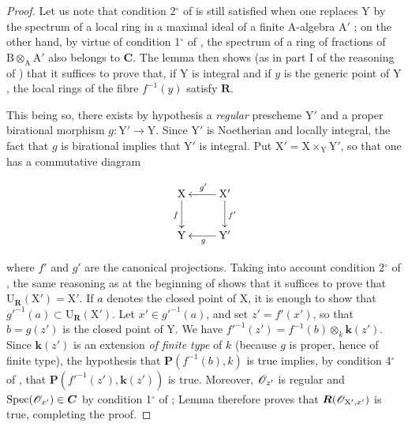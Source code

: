 \begin{proof}
Let us note that condition 2${}^\circ$ of  is still satisfied when one replaces $\mathrm{Y}$ by the spectrum of a local ring in a maximal ideal of a finite $\mathrm{A}$-algebra $\mathrm{A}'$ ; on the other hand, by virtue of condition 1${}^\circ$ of , the spectrum of a ring of fractions of $\mathrm{B}\otimes_\mathrm{A}\mathrm{A}'$ also belongs to $\boldsymbol{C}$. The lemma  then shows (as in part I of the reasoning of ) that it suffices to prove that, if $\mathrm{Y}$ is integral and if $y$ is the generic point of $\mathrm{Y}$, the local rings of the fibre $f^{-1}(y)$ satisfy $\boldsymbol{R}$.

This being so, there exists by hypothesis a \emph{regular} prescheme $\mathrm{Y}'$ and a proper birational morphism $g:\mathrm{Y}'\to\mathrm{Y}$. Since $\mathrm{Y}'$ is Noetherian and locally integral, the fact that $g$ is birational implies that $\mathrm{Y}'$ is integral. Put $\mathrm{X}'=\mathrm{X}\times_\mathrm{Y}\mathrm{Y}'$, so that one has a commutative diagram

\begin{env}[7.9.8.1]
\label{IV.7.9.8.1}
\[
  \xymatrix{
    \mathrm{X} \ar[d]_f & \mathrm{X}' \ar[l]_{g'} \ar[d]^{f'} \\
    \mathrm{Y} & \mathrm{Y}' \ar[l]^g
  }
\]
\end{env}

where $f'$ and $g'$ are the canonical projections. Taking into account condition 2${}^\circ$ of , the same reasoning as at the beginning of  shows that it suffices to prove
that $\mathrm{U}_{\mathbf{R}}(\mathrm{X}')=\mathrm{X}'$. If $a$ denotes the closed point of $\mathrm{X}$, it is enough to show that $g'^{-1}(a)\subset\mathrm{U}_{\mathbf{R}}(\mathrm{X}')$. Let $x'\in g'^{-1}(a)$, and set $z'=f'(x')$, so that $b=g(z')$ is the closed point of $\mathrm{Y}$. We have $f'^{-1}(z')=f^{-1}(b)\otimes_k \boldsymbol{k}(z')$.
Since $\boldsymbol{k}(z')$ is an extension \emph{of finite type} of $k$ (because $g$ is proper, hence of finite type), the hypothesis that $\boldsymbol{P}(f^{-1}(b),k)$ is true implies, by condition 4${}^\circ$ of , that $\boldsymbol{P}(f'^{-1}(z'),\boldsymbol{k}(z'))$ is true. Moreover, $\mathscr{O}_{z'}$ is regular and $\operatorname{Spec}(\mathscr{O}_{x'})\in\boldsymbol{C}$ by condition 1${}^\circ$ of ; Lemma  therefore proves that $\boldsymbol{R}(\mathscr{O}_{\mathrm{X}',x'})$ is true, completing the proof.
\end{proof}

